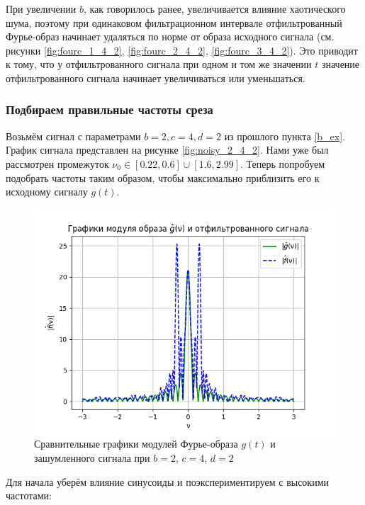 При увеличении $b$, как говорилось ранее, увеличивается влияние хаотического шума, поэтому при одинаковом фильтрационном интервале отфильтрованный Фурье-образ начинает удаляться по норме от образа исходного сигнала (см. рисунки \ref{fig:fourc_1_4_2}, \ref{fig:fourc_2_4_2}, \ref{fig:fourc_3_4_2}). Это приводит к тому, что у отфильтрованного сигнала при одном и том же значении $t$ значение отфильтрованного сигнала начинает увеличиваться или уменьшаться.

\subsubsection{Подбираем правильные частоты среза }

Возьмём сигнал с параметрами $b=2, c=4, d=2$ из прошлого пункта \ref{b_ex}. График сигнала представлен на рисунке \ref{fig:noisy_2_4_2}. Нами уже был рассмотрен промежуток $\nu_0 \in [0.22, 0.6] \cup [1.6, 2.99]$. Теперь попробуем подобрать частоты таким образом, чтобы максимально приблизить его к исходному сигналу $g(t)$.

\clearpage

\begin{figure}[ht!]
    \centering
    \includegraphics[scale=0.65]{media/1 task/specific_freq/Image_2_4_2_Begi.png}
    \caption{Сравнительные графики модулей Фурье-образа $g(t)$ и зашумленного сигнала при  $b=2$,  $c=4$,  $d=2$}
    \label{fig:fourcorig_2_4_2}
\end{figure}

Для начала уберём влияние синусоиды и поэкспериментируем с высокими частотами:


